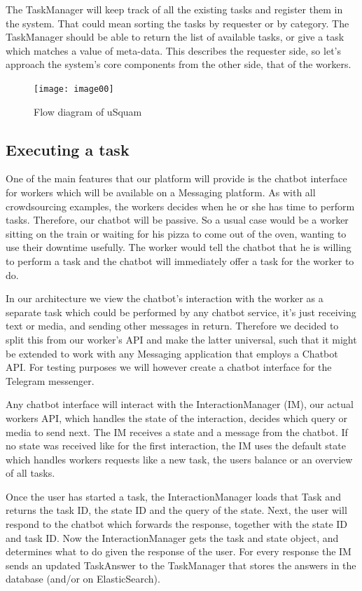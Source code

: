 \documentclass[a4paper,dutch,fleqn]{exam}
\begin{document}
The TaskManager will keep track of all the existing tasks and register them in the system. That could mean sorting the tasks by requester or by category. The TaskManager should be able to return the list of available tasks, or give a task which matches a value of meta-data. This describes the requester side, so let's approach the system's core components from the other side, that of the workers.

\begin{figure}[!ht]
    \centering
    \texttt{[image: image00]}
    \caption{Flow diagram of uSquam}
\end{figure}

\subsection{Executing a task}
One of the main features that our platform will provide is the chatbot interface for workers which will be available on a Messaging platform. As with all crowdsourcing examples, the workers decides when he or she has time to perform tasks. Therefore, our chatbot will be passive. So a usual case would be a worker sitting on the train or waiting for his pizza to come out of the oven, wanting to use their downtime usefully. The worker would tell the chatbot that he is willing to perform a task and the chatbot will immediately offer a task for the worker to do. 

In our architecture we view the chatbot's interaction with the worker as a separate task which could be performed by any chatbot service, it's just receiving text or media, and sending other messages in return. Therefore we decided to split this from our worker's API and make the latter universal, such that it might be extended to work with any Messaging application that employs a Chatbot API. For testing purposes we will however create a chatbot interface for the Telegram messenger. 

Any chatbot interface will interact with the InteractionManager (IM), our actual workers API, which handles the state of the interaction, decides which query or media to send next. The IM receives a state and a message from the chatbot. If no state was received like for the first interaction, the IM uses the default state which handles workers requests like a new task, the users balance or an overview of all tasks. 

Once the user has started a task, the InteractionManager loads that Task and returns the task ID, the state ID and the query of the state. Next, the user will respond to the chatbot which forwards the response, together with the state ID and task ID. Now the InteractionManager gets the task and state object, and determines what to do given the response of the user. For every response the IM sends an updated TaskAnswer to the TaskManager that stores the answers in the database (and/or on ElasticSearch).
\end{document}
